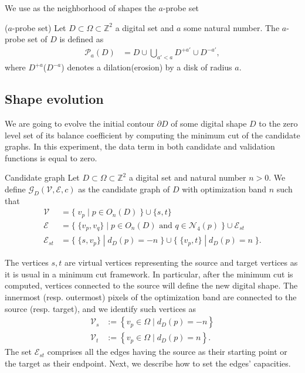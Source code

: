 \documentclass[runningheads]{llncs}
\newcommand{\daniel}[1]{ {\color{blue}#1} }
\newcommand{\Ds}{D}
\begin{document}
%
We use as the neighborhood of shapes the $a$-probe set
%
\begin{definition}{($a$-probe set)}
	Let $\Ds \subset \Omega \subset \mathbb{Z}^2$ a digital set and $a$ some natural number. The $a$-probe set of $\Ds$ is defined as
	\begin{align*}
		\mathcal{P}_a(\Ds) &= \Ds \cup \bigcup_{a' < a}{\Ds^{+a'} \cup \Ds^{-a'}},
	\end{align*}
	where $\Ds^{+a}$($\Ds^{-a}$) denotes a dilation(erosion) by a disk of radius $a$.
\end{definition}
%

\daniel{
\subsection{Shape evolution}
We are going to evolve the initial contour $\partial D$ of some digital shape $D$ to the zero level set of its balance coefficient by computing the minimum cut of the candidate graphs. In this experiment, the data term in both candidate and validation functions is equal to zero.}
%
\begin{definition}{Candidate graph}
Let $D \subset \Omega \subset \mathbb{Z}^2$ a digital set and natural number $n>0$. We define $\mathcal{G}_D(\mathcal{V},\mathcal{E},c)$ as the candidate graph of $D$ with optimization band $n$ such that
%
\begin{align*}
\mathcal{V} &= \big\{\; v_p \; | \; p \in O_n(D) \;\} \cup \{s,t \big\} \\
\mathcal{E} &= \big\{ \; \{v_p,v_q\} \; | \; p \in O_n(D) \text{ and } q \in \mathcal{N}_4(p) \; \big\} \cup \mathcal{E}_{st}\\
\mathcal{E}_{st} &= \big\{\; \{s,v_p\} \; | \; d_D(p)=-n \; \big\} \cup \big\{\; \{v_p,t\} \; | \; d_D(p)=n \; \big\}.
\end{align*}
%
\end{definition}

The vertices $s,t$ are virtual vertices representing the source and target vertices as it is usual in a minimum cut framework. In particular, after the minimum cut is computed, vertices connected to the source will define the new digital shape. The innermost (resp. outermost) pixels of the optimization band are connected to the source (resp. target), and we identify such vertices as
%
\begin{align*}
	\mathcal{V}_s &:=\left\{ v_p \in \Omega \; | \; d_{D}(p) = -n \right\} \\
	\mathcal{V}_t &:=\left\{ v_p \in \Omega \; | \; d_{D}(p) = n \right\}.
\end{align*}
%
The set $\mathcal{E}_{st}$ comprises all the edges having the source as their starting point or the target as their endpoint. Next, we describe how to set the edges' capacities.
\end{document}
